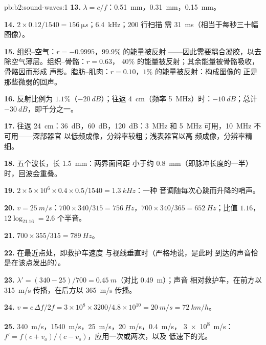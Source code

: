 \begin{solution}{pb:b2:sound-waves:1}
\textbf{13.} $\lambda = c/f$：\qty{0.51}{mm}，\qty{0.31}{mm}，\qty{0.15}{mm}。

\textbf{14.} $2 \times 0.12/1540 = \qty{156}{\micro s}$；\qty{6.4}{kHz}；$200$ 行扫描
需 \qty{31}{ms}（相当于每秒三十幅图像）。

\textbf{15.} 组织–空气：$r = -0.9995$，$99.9\%$ 的能量被反射
——因此需要耦合凝胶，以去除空气薄层。组织–骨骼：$r = 0.63$，
$40\%$ 的能量被反射；其余能量被骨骼吸收，骨骼因而形成
声影。脂肪–肌肉：$r = 0.10$，$1\%$ 的能量被反射：构成图像的
正是那些微弱的回声。

\textbf{16.} 反射比例为 $1.1\%$（$-\qty{20}{dB}$）；往返
\qty{4}{cm}（频率 \qty{5}{MHz}）时：$-\qty{10}{dB}$；总计 $-\qty{30}{dB}$，即千分之一。

\textbf{17.} 往返 \qty{24}{cm}：\qty{36}{dB}，\qty{60}{dB}，\qty{120}{dB}：\qty{3}{MHz}
和 \qty{5}{MHz} 可用，\qty{10}{MHz} 不可用——深部器官
以低频成像，分辨率较粗；浅表器官以高
频成像，分辨率精细。

\textbf{18.} 五个波长，长 \qty{1.5}{mm}：两界面间距
小于约 \qty{0.8}{mm}（即脉冲长度的一半）时，回波会重叠。

\textbf{19.} $2 \times 5 \times 10^6 \times 0.4 \times 0.5/1540 = \qty{1.3}{kHz}$：一种
音调随每次心跳而升降的哨声。

\textbf{20.} $v = \qty{25}{m/s}$：$700 \times 340/315 = \qty{756}{Hz}$，$700 \times 340/365 =
\qty{652}{Hz}$；比值 $1.16$，$12\log_21.16 = 2.6$ 个半音。

\textbf{21.} $700 \times 355/315 = \qty{789}{Hz}$。

\textbf{22.} 在最近点处，即救护车速度
与视线垂直时（严格地说，是此时
到达的声音恰是在该点发出的）。

\textbf{23.} $\lambda' = (340 - 25)/700 = \qty{0.45}{m}$（对比 \qty{0.49}{m}）；声音
相对救护车，在前方以 \qty{315}{m/s} 传播，在后方以
\qty{365}{m/s} 传播。

\textbf{24.} $v = c\,\Delta f/2f = 3 \times 10^8 \times 3200/4.8 \times 10^{10} = \qty{20}{m/s} =
\qty{72}{km/h}$。

\textbf{25.} \qty{340}{m/s}，\qty{1540}{m/s}，\qty{25}{m/s}，\qty{20}{m/s}，\qty{0.4}{m/s}，
\qty{3e8}{m/s}：$f' = f(c + v_o)/(c - v_s)$，应用一次或两次，以及
低速下的光。
\end{solution}
